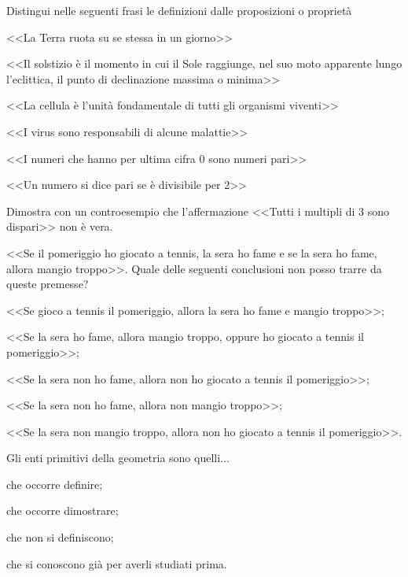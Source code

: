 \begin{esercizio}
\label{ese:1.18}
Distingui nelle seguenti frasi le definizioni dalle proposizioni o 
proprietà
\begin{enumeratea}
\item <<La Terra ruota su se stessa in un giorno>>		
			\hfill\boxD\quad\boxP
\item <<Il solstizio è il momento in cui il Sole raggiunge, nel suo 
moto apparente lungo l'eclittica, il punto di declinazione massima o 
minima>>			\hfill\boxD\quad\boxP
\item <<La cellula è l'unità fondamentale di tutti gli organismi 
viventi>>\hfill\boxD\quad\boxP
\item <<I virus sono responsabili di alcune 
malattie>>\hfill\boxD\quad\boxP
\item <<I numeri che hanno per ultima cifra 0 sono numeri 
pari>>\hfill\boxD\quad\boxP
\item <<Un numero si dice pari se è divisibile per 
2>>\hfill\boxD\quad\boxP
\end{enumeratea}
\end{esercizio}

\begin{esercizio}
\label{ese:1.19}
Dimostra con un controesempio che l'affermazione <<Tutti i multipli 
di 3 sono dispari>> non è vera.
\end{esercizio}


\begin{esercizio}
\label{ese:1.28}
<<Se il pomeriggio ho giocato a tennis, la sera ho fame e se la sera 
ho fame, allora mangio troppo>>. Quale delle seguenti conclusioni non 
posso trarre da queste premesse?
\begin{enumeratea}
\item <<Se gioco a tennis il pomeriggio, allora la sera ho fame e 
mangio troppo>>;
\item <<Se la sera ho fame, allora mangio troppo, oppure ho giocato a 
tennis il pomeriggio>>;
\item <<Se la sera non ho fame, allora non ho giocato a tennis il 
pomeriggio>>;
\item <<Se la sera non ho fame, allora non mangio troppo>>;
\item <<Se la sera non mangio troppo, allora non ho giocato a tennis 
il pomeriggio>>.
\end{enumeratea}
\end{esercizio}


\begin{esercizio}
\label{ese:1.33}
Gli enti primitivi della geometria sono quelli...
\begin{enumeratea}
\item che occorre definire;
\item che occorre dimostrare;
\item che non si definiscono;
\item che si conoscono già per averli studiati prima.
\end{enumeratea}
\end{esercizio}

